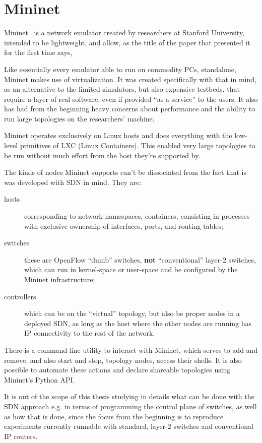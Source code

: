\section{Mininet}
\label{sec:exemulmininet}

Mininet~\cite{mininetnetworklaptop} is a network emulator created by researchers at Stanford University, intended to be lightweight, and allow, as the title of the paper that presented it for the first time says, 

Like essentially every emulator able to run on commodity PCs, standalone, Mininet makes use of virtualization.
It was created specifically with that in mind, as an alternative to the limited simulators, but also expensive testbeds, that require a layer of real software, even if provided ``as a service'' to the users.
It also has had from the beginning heavy concerns about performance and the ability to run large topologies on the researchers' machine.

Mininet operates exclusively on Linux hosts and does everything with the low-level primitives of LXC (Linux Containers).
This enabled very large topologies to be run without much effort from the host they're supported by.

The kinds of nodes Mininet supports can't be dissociated from the fact that is was developed with SDN in mind.
They are:
\begin{description}
	\item[hosts] corresponding to network namespaces, containers, consisting in processes with exclusive ownership of interfaces, ports, and routing tables;
	\item[switches] these are OpenFlow ``dumb'' switches, \textbf{not} ``conventional'' layer-2 switches, which can run in kernel-space or user-space and be configured by the Mininet infrastructure;
	\item[controllers] which can be on the ``virtual'' topology, but also be proper nodes in a deployed SDN, as long as the host where the other nodes are running has IP connectivity to the rest of the network.
\end{description}

There is a command-line utility to interact with Mininet, which serves to add and remove, and also start and stop, topology nodes, access their shells.
It is also possible to automate these actions and declare shareable topologies using Mininet's Python API.

It is out of the scope of this thesis studying in details what can be done with the SDN approach e.g. in terms of programming the control plane of switches, as well as how that is done, since the focus from the beginning is to reproduce experiments currently runnable with standard, layer-2 switches and conventional IP routers.

